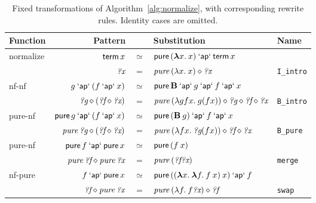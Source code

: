 \begin{table}[t]\centering\small
\begin{tabular}{lrcll}
Function & Pattern & & Substitution & Name \\
\hline
normalize & $\sterm x$ & $\simeq$ & $\spure{(\sabs{x}{x})} \sap \sterm x$ \\
	& $\svar{x}$ & $=$ & $\pure{(\abs{x}{x})} \ap \svar{x}$ & \texttt{I\_intro} \\[1ex]
nf-nf & $g \sap (f \sap x)$ & $\simeq$ & $\spure \mathbf{B} \sap g \sap f \sap x$ \\
	& $\svar{g} \ap (\svar{f} \ap \svar{x})$ & $=$ & $\pure{(\abs{g f x}{g (f x)})} \ap \svar{g} \ap \svar{f} \ap \svar{x}$ & \texttt{B\_intro} \\[1ex]
pure-nf & $\spure g \sap (f \sap x)$ & $\simeq$ & $\spure{(\mathbf{B} \sapp g)} \sap f \sap x$ \\
	& $\pure \svar{g} \ap (\svar{f} \ap \svar{x})$ & $=$ & $\pure{(\abs{f x}{\svar{g} (f x)})} \ap \svar{f} \ap \svar{x}$ & \texttt{B\_pure} \\[1ex]
pure-nf & $\spure f \sap \spure x$ & $\simeq$ & $\spure{(f \sapp x)}$ \\
	& $\pure \svar{f} \ap \pure \svar{x}$ & $=$ & $\pure{(\svar{f} \svar{x})}$ & \texttt{merge} \\[1ex]
nf-pure & $f \sap \spure x$ & $\simeq$ & $\spure{((\sabs{x}{\sabs{f}{f \sapp x}}) \sapp x)} \sap f$ \\
	& $\svar{f} \ap \pure \svar{x}$ & $=$ & $\pure{(\abs{f}{f \svar{x}})} \ap \svar{f}$ & \texttt{swap}
\end{tabular}
\caption{Fixed transformations of Algorithm~\ref{alg:normalize}, with
corresponding rewrite rules. Identity cases are omitted.}
\label{tab:normalize-rules}
\end{table}

